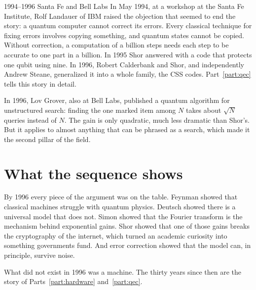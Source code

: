 \begin{history}{1994--1996 \textperiodcentered{} Santa Fe and Bell Labs}
In May 1994, at a workshop at the Santa Fe Institute, Rolf Landauer of IBM
raised the objection that seemed to end the story: a quantum computer cannot
correct its errors. Every classical technique for fixing errors involves copying
something, and quantum states cannot be copied. Without correction, a
computation of a billion steps needs each step to be accurate to one part in a
billion. In 1995 Shor answered with a code that protects one qubit using nine.
In 1996, Robert Calderbank and Shor, and independently Andrew Steane, generalized
it into a whole family, the CSS codes. Part~\ref{part:qec} tells this story in detail.
\end{history}

In 1996, Lov Grover, also at Bell Labs, published a quantum algorithm for
unstructured search: finding the one marked item among $N$ takes about
$\sqrt{N}$ queries instead of $N$. The gain is only quadratic, much less dramatic
than Shor's. But it applies to almost anything that can be phrased as a search,
which made it the second pillar of the field.

\section{What the sequence shows}

By 1996 every piece of the argument was on the table. Feynman showed that
classical machines struggle with quantum physics. Deutsch showed there is a
universal model that does not. Simon showed that the Fourier transform is the
mechanism behind exponential gains. Shor showed that one of those gains breaks
the cryptography of the internet, which turned an academic curiosity into
something governments fund. And error correction showed that the model can, in
principle, survive noise.

What did not exist in 1996 was a machine. The thirty years since then are the
story of Parts~\ref{part:hardware} and~\ref{part:qec}.
